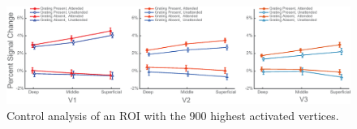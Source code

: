 \begin{figure}[!ht]
\centering
\includegraphics[width=1.0\textwidth, clip=true]{./Chapters/04_Attention/Images/SM_LayerResults_900vertices}
\caption{Control analysis of an ROI with the 900 highest activated vertices.}
\label{fig:layerresults900}
\end{figure}